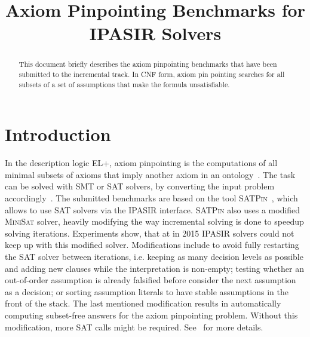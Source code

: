 \documentclass[conference]{IEEEtran}
\begin{document}
	
\title{Axiom Pinpointing Benchmarks for IPASIR Solvers}

\author{
}

\maketitle

\def\satpin{\textsc{SATPin}\xspace}

\begin{abstract}
This document briefly describes the axiom pinpointing benchmarks that have been submitted to the incremental track.
In CNF form, axiom pin pointing searches for all subsets of a set of assumptions that make the formula unsatisfiable.
\end{abstract}

\section{Introduction}

In the description logic EL+, axiom pinpointing is the computations of all minimal subsets of axioms that imply another axiom in an ontology~\cite{BaBL-IJCAI05}.
The task can be solved with SMT or SAT solvers, by converting the input problem accordingly~\cite{SeVe15}.
The submitted benchmarks are based on the tool \satpin~\cite{MaPR16,MaPR-KI20}, which allows to use SAT solvers via the IPASIR interface.
\satpin also uses a modified \textsc{MiniSat} solver, heavily modifying the way incremental solving is done to speedup solving iterations.
Experiments show, that at in 2015 IPASIR solvers could not keep up with this modified solver.
Modifications include to avoid fully restarting the SAT solver between iterations, i.e. keeping as many decision levels as possible and adding new clauses while the interpretation is non-empty; testing whether an out-of-order assumption is already falsified before consider the next assumption as a decision; or sorting assumption literals to have stable assumptions in the front of the stack.
The last mentioned modification results in automatically computing subset-free answers for the axiom pinpointing problem.
Without this modification, more SAT calls might be required.
See~\cite{MaPR16,MaPR-KI20} for more details.
\end{document}

